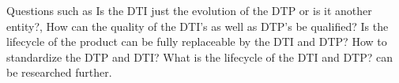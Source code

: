 \documentclass[conference]{IEEEtran}
\begin{document}
    Questions such as Is the DTI just the evolution of the DTP or is it another entity?, How can the quality of the DTI's as well as DTP's be qualified? Is the lifecycle of the product can be fully replaceable by the DTI and DTP? How to standardize the DTP and DTI? What is the lifecycle of the DTI and DTP?  can be researched further.
    
    
    
\end{document}
